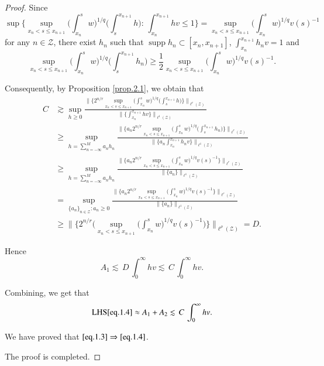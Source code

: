 \documentclass[12pt]{amsart}
\theoremstyle{plain}
\theoremstyle{definition}
\numberwithin{thm}{section}
\numberwithin{equation}{section}
\begin{document}
\begin{proof}
	Since 
	$$
	\sup \bigg\{ \sup_{x_n < s \le x_{n+1}} \bigg(
	\int_{x_n}^s w \bigg)^{1 / q} \bigg( \int_s^{x_{n+1}} h\bigg) :\,  \int_{x_n}^{x_{n+1}} hv \le 1 \bigg\} = \sup_{{x_n} < s \le x_{n+1}} \bigg(	\int_{x_n}^s w \bigg)^{1 / q} v(s)^{-1}
	$$
	for any $n \in {\mathcal Z}$, there exist $h_n$ such that ${\operatorname{supp}} h_n \subset [x_n,x_{n+1}]$, $\int_{x_n}^{x_{n+1}} h_n v = 1$ and
	$$
	\sup_{x_n < s \le x_{n+1}}\bigg(\int_{x_n}^s w \bigg)^{1 / q} \bigg( \int_s^{x_{n+1}} h_n\bigg) \ge \frac{1}{2}
	\sup_{{x_n} < s \le x_{n+1}} \bigg(	\int_{x_n}^s w \bigg)^{1 / q} v(s)^{-1}.
	$$

	Consequently, by Proposition \ref{prop.2.1}, we obtain that
	\begin{align*}
	C & \gtrsim \sup_{h \ge 0} \frac{\bigg\| \bigg\{ 2^{n/r} \sup_{x_n < s \le x_{n+1}} \bigg( \int_{x_n}^s w \bigg)^{1 / q} \bigg( \int_s^{x_{n+1}} h\bigg) \bigg\} \bigg\|_{\ell^r ({\mathcal Z})}}{\bigg\| \bigg\{ \int_{x_n}^{x_{n+1}} h v \bigg\} \bigg\|_{\ell^1 ({\mathcal Z})}} \\
	& \ge \sup_{h = \sum_{n = - \infty}^M a_n h_n} \frac{\bigg\| \bigg\{ a_n 2^{n/r} \sup_{x_n < s \le x_{n+1}} \bigg( \int_{x_n}^s w \bigg)^{1 / q} \bigg( \int_s^{x_{n+1}} h_n \bigg) \bigg\} \bigg\|_{\ell^r ({\mathcal Z})}}{\bigg\| \bigg\{a_n \int_{x_n}^{x_{n+1}} h_n v \bigg\} \bigg\|_{\ell^1 ({\mathcal Z})}} \\
	& \ge \sup_{h = \sum_{n = - \infty}^M a_n h_n} \frac{\bigg\| \bigg\{ a_n 2^{n/r} \sup_{{x_n} < s \le x_{n+1}} \bigg(	\int_{x_n}^s w \bigg)^{1 / q} v(s)^{-1} \bigg\} \bigg\|_{\ell^r ({\mathcal Z})}}{\| \{a_n  \} \|_{\ell^1 ({\mathcal Z})}} \\	
	& = \sup_{\{a_n\}_{n \in {\mathcal Z}}: a_n \ge 0} \frac{\bigg\| \bigg\{ a_n 2^{n/r} \sup_{{x_n} < s \le x_{n+1}} \bigg(	\int_{x_n}^s w \bigg)^{1 / q} v(s)^{-1} \bigg\} \bigg\|_{\ell^r ({\mathcal Z})}}{\| \{a_n  \} \|_{\ell^1 ({\mathcal Z})}} \\
	& \ge \bigg\| \bigg\{ 2^{n/r} \bigg( \sup_{{x_n} < s \le x_{n+1}} \bigg(
	\int_{x_n}^s w \bigg)^{1 / q} v(s)^{-1} \bigg) \bigg\} \bigg\|_{\ell^{\rho}({\mathcal Z})} = D.
	\end{align*}

	Hence
	$$
	A_1 \lesssim \, D  \, \int_0^{\infty} h v \lesssim \, C  \, \int_0^{\infty} h v.
	$$

	Combining, we get that
	$$
	{\operatorname{LHS}}{\eqref{eq.1.4}} \approx A_1 + A_2 \lesssim \, C  \, \int_0^{\infty} h v.
	$$

	We have proved that $\eqref{eq.1.3} \Rightarrow \eqref{eq.1.4}$.
	
	The proof is completed.
\end{proof}
\end{document}
